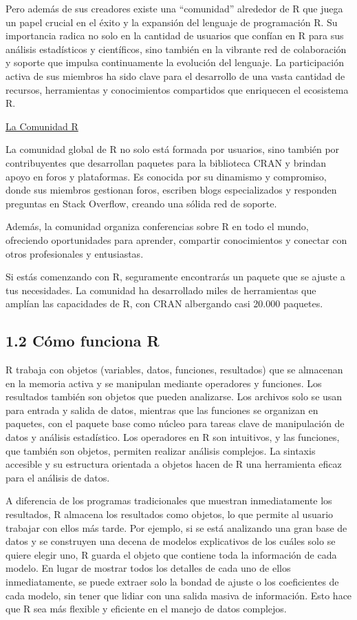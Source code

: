 \documentclass[
  letterpaper,
  DIV=11,
  numbers=noendperiod]{scrreprt}
\begin{document}
Pero además de sus creadores existe una ``comunidad'' alrededor de R que
juega un papel crucial en el éxito y la expansión del lenguaje de
programación R. Su importancia radica no solo en la cantidad de usuarios
que confían en R para sus análisis estadísticos y científicos, sino
también en la vibrante red de colaboración y soporte que impulsa
continuamente la evolución del lenguaje. La participación activa de sus
miembros ha sido clave para el desarrollo de una vasta cantidad de
recursos, herramientas y conocimientos compartidos que enriquecen el
ecosistema R.

\uline{La Comunidad R}

La comunidad global de R no solo está formada por usuarios, sino también
por contribuyentes que desarrollan paquetes para la biblioteca CRAN y
brindan apoyo en foros y plataformas. Es conocida por su dinamismo y
compromiso, donde sus miembros gestionan foros, escriben blogs
especializados y responden preguntas en Stack Overflow, creando una
sólida red de soporte.

Además, la comunidad organiza conferencias sobre R en todo el mundo,
ofreciendo oportunidades para aprender, compartir conocimientos y
conectar con otros profesionales y entusiastas.

Si estás comenzando con R, seguramente encontrarás un paquete que se
ajuste a tus necesidades. La comunidad ha desarrollado miles de
herramientas que amplían las capacidades de R, con CRAN albergando casi
20.000 paquetes.

\hypertarget{cuxf3mo-funciona-r}{%
\subsection{1.2 Cómo funciona R}\label{cuxf3mo-funciona-r}}

R trabaja con objetos (variables, datos, funciones, resultados) que se
almacenan en la memoria activa y se manipulan mediante operadores y
funciones. Los resultados también son objetos que pueden analizarse. Los
archivos solo se usan para entrada y salida de datos, mientras que las
funciones se organizan en paquetes, con el paquete base como núcleo para
tareas clave de manipulación de datos y análisis estadístico. Los
operadores en R son intuitivos, y las funciones, que también son
objetos, permiten realizar análisis complejos. La sintaxis accesible y
su estructura orientada a objetos hacen de R una herramienta eficaz para
el análisis de datos.

A diferencia de los programas tradicionales que muestran inmediatamente
los resultados, R almacena los resultados como objetos, lo que permite
al usuario trabajar con ellos más tarde. Por ejemplo, si se está
analizando una gran base de datos y se construyen una decena de modelos
explicativos de los cuáles solo se quiere elegir uno, R guarda el objeto
que contiene toda la información de cada modelo. En lugar de mostrar
todos los detalles de cada uno de ellos inmediatamente, se puede extraer
solo la bondad de ajuste o los coeficientes de cada modelo, sin tener
que lidiar con una salida masiva de información. Esto hace que R sea más
flexible y eficiente en el manejo de datos complejos.
\end{document}
